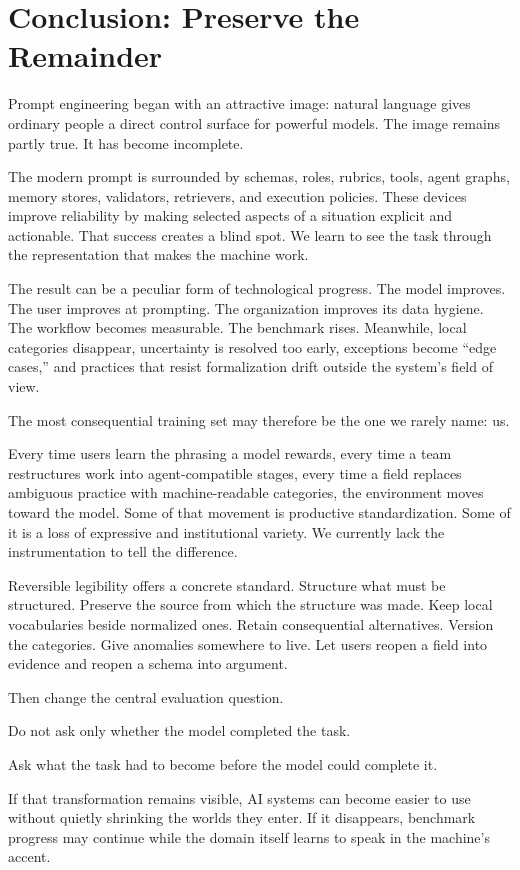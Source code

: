 \documentclass[11pt]{article}
\begin{document}
\section{Conclusion: Preserve the Remainder}

Prompt engineering began with an attractive image: natural language gives ordinary people a direct control surface for powerful models. The image remains partly true. It has become incomplete.

The modern prompt is surrounded by schemas, roles, rubrics, tools, agent graphs, memory stores, validators, retrievers, and execution policies. These devices improve reliability by making selected aspects of a situation explicit and actionable. That success creates a blind spot. We learn to see the task through the representation that makes the machine work.

The result can be a peculiar form of technological progress. The model improves. The user improves at prompting. The organization improves its data hygiene. The workflow becomes measurable. The benchmark rises. Meanwhile, local categories disappear, uncertainty is resolved too early, exceptions become ``edge cases,'' and practices that resist formalization drift outside the system's field of view.

The most consequential training set may therefore be the one we rarely name: us.

Every time users learn the phrasing a model rewards, every time a team restructures work into agent-compatible stages, every time a field replaces ambiguous practice with machine-readable categories, the environment moves toward the model. Some of that movement is productive standardization. Some of it is a loss of expressive and institutional variety. We currently lack the instrumentation to tell the difference.

Reversible legibility offers a concrete standard. Structure what must be structured. Preserve the source from which the structure was made. Keep local vocabularies beside normalized ones. Retain consequential alternatives. Version the categories. Give anomalies somewhere to live. Let users reopen a field into evidence and reopen a schema into argument.

Then change the central evaluation question.

Do not ask only whether the model completed the task.

Ask what the task had to become before the model could complete it.

If that transformation remains visible, AI systems can become easier to use without quietly shrinking the worlds they enter. If it disappears, benchmark progress may continue while the domain itself learns to speak in the machine's accent.
\end{document}
